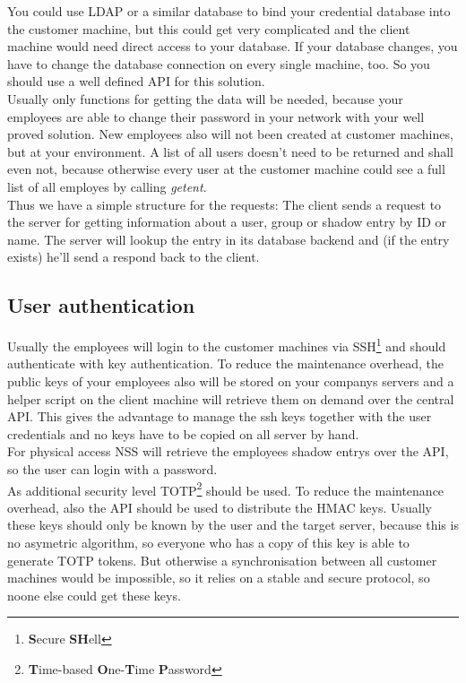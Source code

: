 You could use LDAP or a similar database to bind your credential database into
the customer machine, but this could get very complicated and the client machine
would need direct access to your database. If your database changes, you have to
change the database connection on every single machine, too. So you should use a
well defined API for this solution. \\

Usually only functions for getting the data will be needed, because your
employees are able to change their password in your network with your well
proved solution. New employees also will not been created at customer machines,
but at your environment. A list of all users doesn't need to be returned and
shall even not, because otherwise every user at the customer machine could see a
full list of all employes by calling \textit{getent}. \\

Thus we have a simple structure for the requests: The client sends a request to
the server for getting information about a user, group or shadow entry by ID or
name. The server will lookup the entry in its database backend and (if the entry
exists) he'll send a respond back to the client.


\subsection{User authentication}

Usually the employees will login to the customer machines via
SSH\footnote{\textbf{S}ecure \textbf{SH}ell} and should authenticate with
key authentication. To reduce the maintenance overhead, the public keys of your
employees also will be stored on your companys servers and a helper script on
the client machine will retrieve them on demand over the central API. This gives
the advantage to manage the ssh keys together with the user credentials and no
keys have to be copied on all server by hand. \\

For physical access NSS will retrieve the employees shadow entrys over the API,
so the user can login with a password. \\

As additional security level
TOTP\footnote{\textbf{T}ime-based \textbf{O}ne-\textbf{T}ime \textbf{P}assword}
should be used. To reduce the maintenance overhead, also the API should be used
to distribute the HMAC keys. Usually these keys should only be known by the user
and the target server, because this is no asymetric algorithm, so everyone who
has a copy of this key is able to generate TOTP tokens. But otherwise a
synchronisation between all customer machines would be impossible, so it relies
on a stable and secure protocol, so noone else could get these keys.
